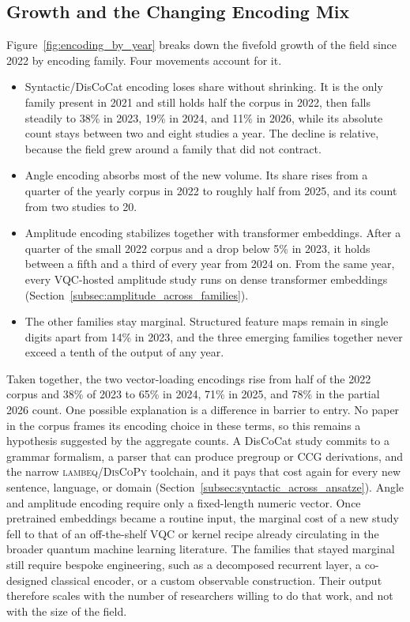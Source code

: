 \documentclass{ieeeaccess}
\begin{document}
\subsection{Growth and the Changing Encoding Mix}
\label{subsec:temporal_encoding}

Figure~\ref{fig:encoding_by_year} breaks down the fivefold growth of the field since 2022 by encoding family. Four movements account for it.

\begin{itemize}
\item Syntactic/DisCoCat encoding loses share without shrinking. It is the only family present in 2021 and still holds half the corpus in 2022, then falls steadily to 38\% in 2023, 19\% in 2024, and 11\% in 2026, while its absolute count stays between two and eight studies a year. The decline is relative, because the field grew around a family that did not contract.

\item Angle encoding absorbs most of the new volume. Its share rises from a quarter of the yearly corpus in 2022 to roughly half from 2025, and its count from two studies to 20.

\item Amplitude encoding stabilizes together with transformer embeddings. After a quarter of the small 2022 corpus and a drop below 5\% in 2023, it holds between a fifth and a third of every year from 2024 on. From the same year, every VQC-hosted amplitude study runs on dense transformer embeddings (Section~\ref{subsec:amplitude_across_families}).

\item The other families stay marginal. Structured feature maps remain in single digits apart from 14\% in 2023, and the three emerging families together never exceed a tenth of the output of any year.
\end{itemize}

Taken together, the two vector-loading encodings rise from half of the 2022 corpus and 38\% of 2023 to 65\% in 2024, 71\% in 2025, and 78\% in the partial 2026 count. One possible explanation is a difference in barrier to entry. No paper in the corpus frames its encoding choice in these terms, so this remains a hypothesis suggested by the aggregate counts. A DisCoCat study commits to a grammar formalism, a parser that can produce pregroup or CCG derivations, and the narrow \textsc{lambeq}/\textsc{DisCoPy} toolchain, and it pays that cost again for every new sentence, language, or domain (Section~\ref{subsec:syntactic_across_ansatze}). Angle and amplitude encoding require only a fixed-length numeric vector. Once pretrained embeddings became a routine input, the marginal cost of a new study fell to that of an off-the-shelf VQC or kernel recipe already circulating in the broader quantum machine learning literature. The families that stayed marginal still require bespoke engineering, such as a decomposed recurrent layer, a co-designed classical encoder, or a custom observable construction. Their output therefore scales with the number of researchers willing to do that work, and not with the size of the field.
\end{document}
